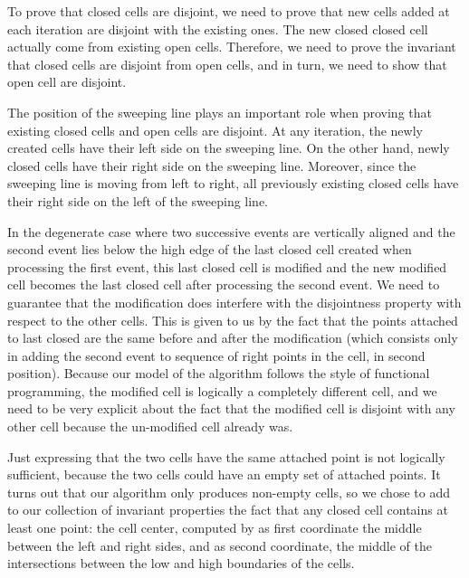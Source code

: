 \documentclass[a4paper, USenglish, cleveref, autoref, thm-restate]{lipics-v2021}
\begin{document}
To prove that closed cells are disjoint, we need to prove that new
cells added at each iteration are disjoint with the existing ones.
The new closed closed cell actually come from
existing open cells.  Therefore, we need to prove the invariant that
closed cells are disjoint from open cells, and in turn, we need to
show that open cell are disjoint.

The position of the sweeping line plays an important role when proving
that existing closed cells and open cells are disjoint.  At any
iteration, the newly created cells have their left side on the
sweeping line.  On the other hand, newly closed cells have their right
side on the sweeping line.  Moreover, since the sweeping line is moving
from left to right, all previously existing closed cells have their
right side on the left of the sweeping line.

In the degenerate case where two successive events are vertically
aligned and the second event lies below the high edge of the last
closed cell created when processing the first event, this last closed
cell is modified and the new modified cell becomes the last closed
cell after processing the second event.  We need to guarantee that
the modification does interfere with the disjointness property with
respect to the other cells.  This is given to us by the fact that the
points attached to last closed are the same before and after the
modification (which consists only in adding the second event to
sequence of right points in the cell, in second position).  Because
our model of the algorithm follows the style of functional
programming, the modified cell is logically a completely different cell,
and we need to be very explicit about the fact that the modified cell
is disjoint with any other cell because the un-modified cell already
was.

\marginpar{\textcolor{blue}{not sure about this par, probably useful,
    but not the right place.}}
Just expressing that the two cells have the same attached point is not
logically sufficient, because the two cells could have an empty set of
attached points.  It turns out that our algorithm only produces
non-empty cells, so we chose to add to our collection of invariant
properties the fact that any closed cell contains at least one point:
the cell center, computed by as first coordinate the middle between
the left and right sides, and as second coordinate, the middle of the
intersections between the low and high boundaries of the cells.
\end{document}
